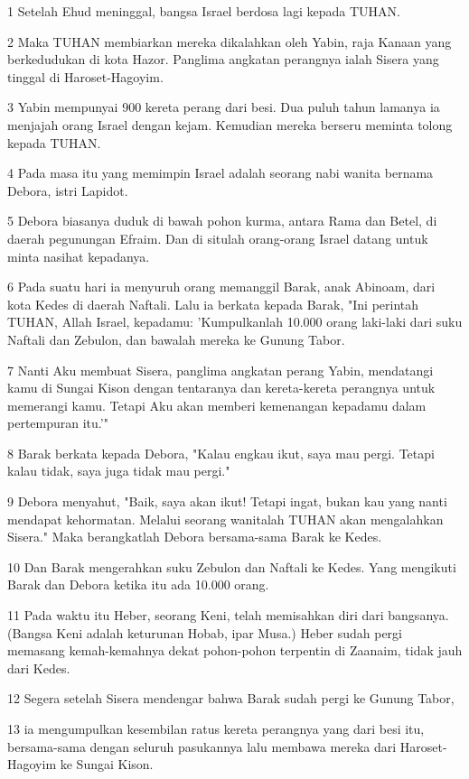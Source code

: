 \par 1 Setelah Ehud meninggal, bangsa Israel berdosa lagi kepada TUHAN.
\par 2 Maka TUHAN membiarkan mereka dikalahkan oleh Yabin, raja Kanaan yang berkedudukan di kota Hazor. Panglima angkatan perangnya ialah Sisera yang tinggal di Haroset-Hagoyim.
\par 3 Yabin mempunyai 900 kereta perang dari besi. Dua puluh tahun lamanya ia menjajah orang Israel dengan kejam. Kemudian mereka berseru meminta tolong kepada TUHAN.
\par 4 Pada masa itu yang memimpin Israel adalah seorang nabi wanita bernama Debora, istri Lapidot.
\par 5 Debora biasanya duduk di bawah pohon kurma, antara Rama dan Betel, di daerah pegunungan Efraim. Dan di situlah orang-orang Israel datang untuk minta nasihat kepadanya.
\par 6 Pada suatu hari ia menyuruh orang memanggil Barak, anak Abinoam, dari kota Kedes di daerah Naftali. Lalu ia berkata kepada Barak, "Ini perintah TUHAN, Allah Israel, kepadamu: 'Kumpulkanlah 10.000 orang laki-laki dari suku Naftali dan Zebulon, dan bawalah mereka ke Gunung Tabor.
\par 7 Nanti Aku membuat Sisera, panglima angkatan perang Yabin, mendatangi kamu di Sungai Kison dengan tentaranya dan kereta-kereta perangnya untuk memerangi kamu. Tetapi Aku akan memberi kemenangan kepadamu dalam pertempuran itu.'"
\par 8 Barak berkata kepada Debora, "Kalau engkau ikut, saya mau pergi. Tetapi kalau tidak, saya juga tidak mau pergi."
\par 9 Debora menyahut, "Baik, saya akan ikut! Tetapi ingat, bukan kau yang nanti mendapat kehormatan. Melalui seorang wanitalah TUHAN akan mengalahkan Sisera." Maka berangkatlah Debora bersama-sama Barak ke Kedes.
\par 10 Dan Barak mengerahkan suku Zebulon dan Naftali ke Kedes. Yang mengikuti Barak dan Debora ketika itu ada 10.000 orang.
\par 11 Pada waktu itu Heber, seorang Keni, telah memisahkan diri dari bangsanya. (Bangsa Keni adalah keturunan Hobab, ipar Musa.) Heber sudah pergi memasang kemah-kemahnya dekat pohon-pohon terpentin di Zaanaim, tidak jauh dari Kedes.
\par 12 Segera setelah Sisera mendengar bahwa Barak sudah pergi ke Gunung Tabor,
\par 13 ia mengumpulkan kesembilan ratus kereta perangnya yang dari besi itu, bersama-sama dengan seluruh pasukannya lalu membawa mereka dari Haroset-Hagoyim ke Sungai Kison.
